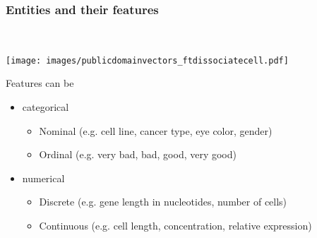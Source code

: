 \documentclass[aspectratio=169]{beamer}
\begin{document}
\begin{frame}
  \frametitle{Entities and their features}    
  \begin{block}{}
    \vspace{0.5cm}
    \ \ \ \
    \begin{minipage}{0.10\textwidth}
      \begin{center}
        \texttt{[image: images/publicdomainvectors\_ftdissociatecell.pdf]}
      \end{center}        
    \end{minipage}
    \hfill
    \begin{minipage}{0.80\textwidth}

      Features can be\\
      \begin{itemize}
        \item categorical
          \begin{itemize}
          \item Nominal (e.g. cell line, cancer type, eye color, gender)
          \item Ordinal (e.g. very bad, bad, good, very good)
          \end{itemize}
        \item numerical
          \begin{itemize}
          \item Discrete (e.g. gene length in nucleotides, number of cells)
          \item Continuous (e.g. cell length, concentration, relative expression) 
          \end{itemize}
      \end{itemize}
      
    \end{minipage}
    \vspace{0.3cm}
  \end{block}
\end{frame}

\end{document}
